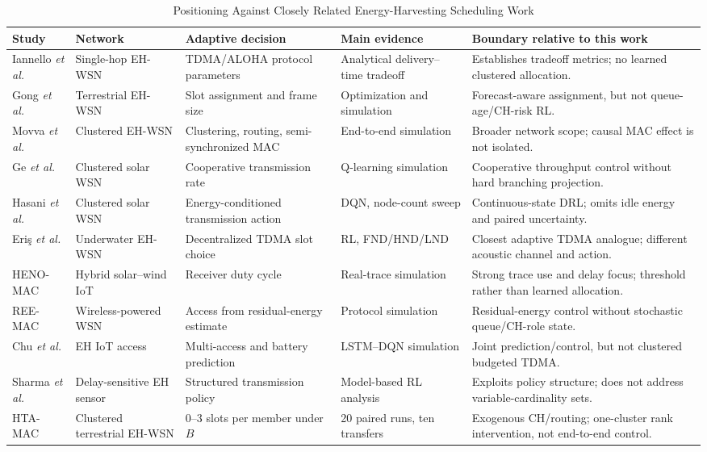 \documentclass[journal]{IEEEtran}
\newcommand{\method}{HTA-MAC}
\begin{document}
\begin{table}[t]
\centering
\caption{Positioning Against Closely Related Energy-Harvesting Scheduling Work}
\label{tab:literature}
\scriptsize
\begin{tabular}{@{}p{2.35cm}p{2.15cm}p{3.0cm}p{2.6cm}p{5.2cm}@{}}
\toprule
Study & Network & Adaptive decision & Main evidence & Boundary relative to this work \\
\midrule
Iannello \emph{et al.} \cite{iannello2012ehmac} & Single-hop EH-WSN & TDMA/ALOHA protocol parameters & Analytical delivery--time tradeoff & Establishes tradeoff metrics; no learned clustered allocation. \\
Gong \emph{et al.} \cite{gong2021ffss} & Terrestrial EH-WSN & Slot assignment and frame size & Optimization and simulation & Forecast-aware assignment, but not queue-age/CH-risk RL. \\
Movva \emph{et al.} \cite{movva2022s2a2mac} & Clustered EH-WSN & Clustering, routing, semi-synchronized MAC & End-to-end simulation & Broader network scope; causal MAC effect is not isolated. \\
Ge \emph{et al.} \cite{ge2021cooperative} & Clustered solar WSN & Cooperative transmission rate & Q-learning simulation & Cooperative throughput control without hard branching projection. \\
Hasani \emph{et al.} \cite{hasani2025drl} & Clustered solar WSN & Energy-conditioned transmission action & DQN, node-count sweep & Continuous-state DRL; omits idle energy and paired uncertainty. \\
Eriş \emph{et al.} \cite{eris2024underwaterrl} & Underwater EH-WSN & Decentralized TDMA slot choice & RL, FND/HND/LND & Closest adaptive TDMA analogue; different acoustic channel and action. \\
HENO-MAC \cite{sarang2024henomac} & Hybrid solar--wind IoT & Receiver duty cycle & Real-trace simulation & Strong trace use and delay focus; threshold rather than learned allocation. \\
REE-MAC \cite{lee2021reemac} & Wireless-powered WSN & Access from residual-energy estimate & Protocol simulation & Residual-energy control without stochastic queue/CH-role state. \\
Chu \emph{et al.} \cite{chu2019multiaccess} & EH IoT access & Multi-access and battery prediction & LSTM--DQN simulation & Joint prediction/control, but not clustered budgeted TDMA. \\
Sharma \emph{et al.} \cite{sharma2019structure} & Delay-sensitive EH sensor & Structured transmission policy & Model-based RL analysis & Exploits policy structure; does not address variable-cardinality sets. \\
\method{} & Clustered terrestrial EH-WSN & 0--3 slots per member under $B$ & 20 paired runs, ten transfers & Exogenous CH/routing; one-cluster rank intervention, not end-to-end control. \\
\bottomrule
\end{tabular}
\end{table}
\end{document}

